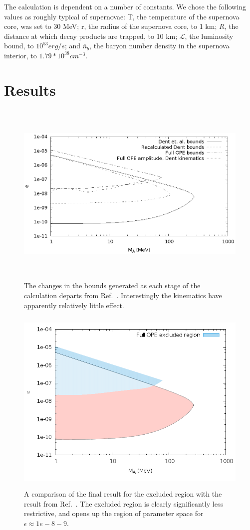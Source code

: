 \documentclass[nofootinbib,aps,prd,preprint,superscriptaddress]{revtex4}
\newcommand{\n}{\overline{n}}
\begin{document}
The calculation is dependent on a number of constants. We chose the following values as roughly typical of supernovae: T, the temperature of the supernova core, was set to 30 MeV; r, the radius of the supernova core, to 1 km; $ R $, the distance at which decay products are trapped, to 10 km; $ \mathcal{L} $, the luminosity bound, to $ 10^{53} erg/s $; and $ \n_b $, the baryon number density in the supernova interior, to $ 1.79*10^{38} cm^{-3} $. 

\section{Results}

\begin{figure}[h!]
\includegraphics[height=9cm]{stages.eps}
\caption{The changes in the bounds generated as each stage of the calculation departs from Ref.~\cite{Dent:2012mx}. Interestingly the kinematics have apparently relatively little effect.}
\end{figure}

\begin{figure}[h!]
	\includegraphics[height=9cm]{endtoend.png}
	\caption{A comparison of the final result for the excluded region with the result from Ref.~\cite{Dent:2012mx}. The excluded region is clearly significantly less restrictive, and opens up the region of parameter space for $\epsilon \approx  1e-8-9 $.}
\end{figure}
\end{document}
